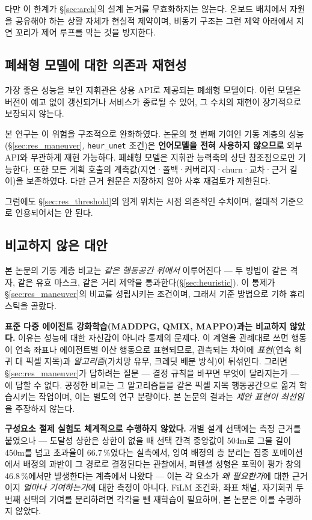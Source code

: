 다만 이 한계가 \S\ref{sec:arch}의 설계 논거를 무효화하지는 않는다. 온보드 배치에서 자원을
공유해야 하는 상황 자체가 현실적 제약이며, 비동기 구조는 그런 제약 아래에서 지연 꼬리가
제어 루프를 막는 것을 방지한다.

\subsection{폐쇄형 모델에 대한 의존과 재현성}

가장 좋은 성능을 보인 지휘관은 상용 API로 제공되는 폐쇄형 모델이다. 이런 모델은 버전이
예고 없이 갱신되거나 서비스가 종료될 수 있어, 그 수치의 재현이 장기적으로 보장되지 않는다.

본 연구는 이 위험을 구조적으로 완화하였다. 논문의 첫 번째 기여인 기동 계층의 성능
(\S\ref{sec:res_maneuver}, \texttt{heur\_unet} 조건)은 \textbf{언어모델을 전혀 사용하지
않으므로} 외부 API와 무관하게 재현 가능하다. 폐쇄형 모델은 지휘관 능력축의 상단 참조점으로만
기능한다. 또한 모든 계획 호출의 계측값(지연·폴백·커버리지·churn·교차·근거 길이)을 보존하였다. 다만 근거 원문은 저장하지 않아 사후 재검토가 제한된다.

그럼에도 \S\ref{sec:res_threshold}의 임계 위치는 시점 의존적인 수치이며, 절대적 기준으로
인용되어서는 안 된다.

\subsection{비교하지 않은 대안}

본 논문의 기동 계층 비교는 \emph{같은 행동공간 위에서} 이루어진다 --- 두 방법이 같은 격자,
같은 유효 마스크, 같은 거리 제약을 통과한다(\S\ref{sec:heuristic}). 이 통제가
\S\ref{sec:res_maneuver}의 비교를 성립시키는 조건이며, 그래서 기준 방법으로 기하
휴리스틱을 골랐다.

\textbf{표준 다중 에이전트 강화학습(MADDPG, QMIX, MAPPO)과는 비교하지 않았다.} 이유는
성능에 대한 자신감이 아니라 통제의 문제다. 이 계열을 관례대로 쓰면 행동이 연속 좌표나
에이전트별 이산 행동으로 표현되므로, 관측되는 차이에 \emph{표현}(연속 회귀 대 픽셀 지목)과
\emph{알고리즘}(가치망 유무, 크레딧 배분 방식)이 뒤섞인다. 그러면 \S\ref{sec:res_maneuver}가
답하려는 질문 --- 결정 규칙을 바꾸면 무엇이 달라지는가 --- 에 답할 수 없다. 공정한 비교는
그 알고리즘들을 같은 픽셀 지목 행동공간으로 옮겨 학습시키는 작업이며, 이는 별도의 연구
분량이다. 본 논문의 결과는 \emph{제안 표현이 최선임}을 주장하지 않는다.

\textbf{구성요소 절제 실험도 체계적으로 수행하지 않았다.} 개별 설계 선택에는 측정 근거를
붙였으나 --- 도달성 상한은 상한이 없을 때 선택 간격 중앙값이 504\unit{m}로 그물 길이
450\unit{m}를 넘고 초과율이 66.7\,\%였다는 실측에서, 잉여 배정의 층 분리는 집중 포메이션에서
배정의 과반이 그 경로로 결정된다는 관찰에서, 퍼텐셜 성형은 포획이 평가 창의 46.8\,\%에서만
발생한다는 계측에서 나왔다 --- 이는 각 요소가 \emph{왜 필요한가}에 대한 근거이지 \emph{얼마나
기여하는가}에 대한 측정이 아니다. FiLM 조건화, 좌표 채널, 자기회귀 두 번째 선택의 기여를
분리하려면 각각을 뺀 재학습이 필요하며, 본 논문은 이를 수행하지 않았다.

